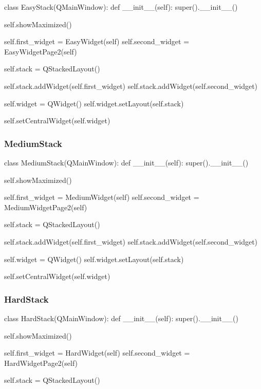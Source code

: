 \begin{landscape}
\begin{python}
class EasyStack(QMainWindow):
    def __init__(self):
        super().__init__()

        self.showMaximized()
        
        self.first_widget = EasyWidget(self)
        self.second_widget = EasyWidgetPage2(self)

        self.stack = QStackedLayout()

        self.stack.addWidget(self.first_widget)
        self.stack.addWidget(self.second_widget)

        self.widget = QWidget()
        self.widget.setLayout(self.stack)

        self.setCentralWidget(self.widget)
\end{python}

\subsubsection{MediumStack}

\begin{python}
class MediumStack(QMainWindow):
    def __init__(self):
        super().__init__()

        self.showMaximized()
        
        self.first_widget = MediumWidget(self)
        self.second_widget = MediumWidgetPage2(self)

        self.stack = QStackedLayout()

        self.stack.addWidget(self.first_widget)
        self.stack.addWidget(self.second_widget)

        self.widget = QWidget()
        self.widget.setLayout(self.stack)

        self.setCentralWidget(self.widget)
\end{python}

\subsubsection{HardStack}

\begin{python}
class HardStack(QMainWindow):
    def __init__(self):
        super().__init__()

        self.showMaximized()
        
        self.first_widget = HardWidget(self)
        self.second_widget = HardWidgetPage2(self)

        self.stack = QStackedLayout()


\end{python}
\end{landscape}
